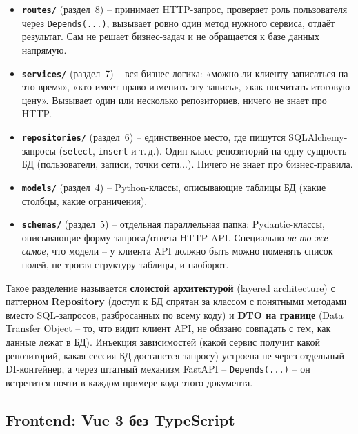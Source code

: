 \begin{itemize}
  \item \textbf{\texttt{routes/}} (раздел~8) -- принимает HTTP-запрос,
        проверяет роль пользователя через \texttt{Depends(...)}, вызывает
        ровно один метод нужного сервиса, отдаёт результат. Сам не решает
        бизнес-задач и не обращается к базе данных напрямую.
  \item \textbf{\texttt{services/}} (раздел~7) -- вся бизнес-логика:
        «можно ли клиенту записаться на это время», «кто имеет право
        изменить эту запись», «как посчитать итоговую цену». Вызывает один
        или несколько репозиториев, ничего не знает про HTTP.
  \item \textbf{\texttt{repositories/}} (раздел~6) -- единственное место,
        где пишутся SQLAlchemy-запросы (\texttt{select}, \texttt{insert}
        и т.\,д.). Один класс-репозиторий на одну сущность БД (пользователи,
        записи, точки сети...). Ничего не знает про бизнес-правила.
  \item \textbf{\texttt{models/}} (раздел~4) -- Python-классы, описывающие
        таблицы БД (какие столбцы, какие ограничения).
  \item \textbf{\texttt{schemas/}} (раздел~5) -- отдельная параллельная
        папка: Pydantic-классы, описывающие форму запроса/ответа HTTP API.
        Специально \emph{не то же самое}, что модели -- у клиента API
        должно быть можно поменять список полей, не трогая структуру
        таблицы, и наоборот.
\end{itemize}

Такое разделение называется \textbf{слоистой архитектурой}
(layered architecture) с паттерном \textbf{Repository} (доступ к БД
спрятан за классом с понятными методами вместо SQL-запросов, разбросанных
по всему коду) и \textbf{DTO на границе} (Data Transfer Object -- то, что
видит клиент API, не обязано совпадать с тем, как данные лежат в БД).
Инъекция зависимостей (какой сервис получит какой репозиторий, какая
сессия БД достанется запросу) устроена не через отдельный
DI-контейнер, а через штатный механизм FastAPI --
\texttt{Depends(...)} -- он встретится почти в каждом примере кода этого
документа.

\subsection*{Frontend: Vue 3 без TypeScript}

